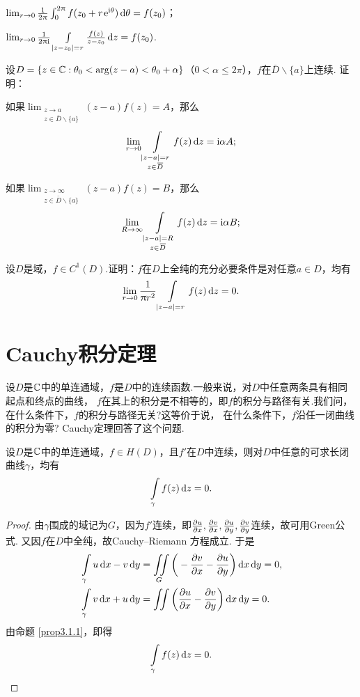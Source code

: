 \begin{xiti}
    \begin{enuma}
      \item $\lim_{r\to0}\frac1{2\uppi}\int_0^{2\uppi}f(z_0+r\operatorname{\!\!\;\mathrm e}^{\mathrm i\theta})\mathop{}\!\mathrm{d}\theta=f(z_0)$；
      \item $\lim_{r\to0}\frac1{2\uppi\mathrm i}\int\limits_{|z-z_0|=r}\frac{f(z)}{z-z_0}\mathop{}\!\mathrm dz=f(z_0)$.
    \end{enuma}
  \item 设$D=\{z\in\mathbb C:\theta_0<\arg(z-a)<\theta_0+\alpha\}$（$0<\alpha\le2\pi$），$f$在$\bar D\backslash\{a\}$上连续. 证明：
    \begin{enuma}
      \item 如果$\lim_{\substack{z\to a\\z\in\bar D\backslash\{a\}}}(z-a)f(z)=A$，那么
        \[
          \lim_{r\to0}\int\limits_{\substack{|z-a| = r\\z\in{}\mkern2mu\overline{\mkern-2muD}}}f(z)\mathop{}\!\mathrm dz = \mathrm i\alpha A;
        \]
      \item 如果$\lim_{\substack{z\to \infty\\z\in\bar D\backslash\{a\}}}(z-a)f(z)=B$，那么
        \[
          \lim_{R\to\infty}\int\limits_{\substack{|z-a|=R\\z\in {}\mkern2mu\overline{\mkern-2muD}}}f(z)\mathop{}\!\mathrm dz = \mathrm i\alpha B;
        \]
    \end{enuma}
  \item 设$D$是域，$f\in C^1(D)$.证明：$f$在$D$上全纯的充分必要条件是对任意$a\in D$，均有
   \[
     \lim_{r\to0} \frac1{\uppi r^2} \int\limits_{|z-a|=r}f(z)\mathop{}\!\mathrm dz = 0.
   \]
\end{xiti}

\section{Cauchy积分定理\label{sec3.2}}
设$D$是$\mathbb C$中的单连通域，$f$是$D$中的连续函数.一般来说，对$D$中任意两条具有相同起点和终点的曲线，
$f$在其上的积分是不相等的，即$f$的积分与路径有关.我们问，在什么条件下，$f$的积分与路径无关?这等价于说，
在什么条件下，$f$沿任一闭曲线的积分为零? Cauchy定理回答了这个问题.
\begin{theorem}\label{thm3.2.1}
  设$D$是$\mathbb C$中的单连通域，$f\in H(D)$，且$f'$在$D$中连续，则对$D$中任意的可求长闭曲线$\gamma$，均有
  \[
    \int\limits_\gamma f(z)\mathop{}\!\mathrm dz = 0.
  \]
\end{theorem}
\begin{proof}
  由$\gamma$围成的域记为$G$，因为$f'$连续，即$\frac{\partial u}{\partial x},\frac{\partial v}{\partial x},\frac{\partial u}{\partial y},\frac{\partial v}{\partial y}$连续，故可用Green公式.
  又因$f$在$D$中全纯，故Cauchy--Riemann 方程成立. 于是
  \begin{align*}
    & \int\limits_\gamma u\dx-v\dy = \iint\limits_G\bigg(-\pp vx-\pp uy\bigg)\dx\dy = 0,\\
    & \int\limits_\gamma v\dx+u\dy = \iint\limits\bigg(\pp ux-\pp vy\bigg)\dx\dy = 0.
  \end{align*}
  由命题 \ref{prop3.1.1}，即得
  \begin{equation*}
    \int\limits_\gamma f(z)\mathop{}\!\mathrm dz = 0. \qedhere
  \end{equation*}
\end{proof}


